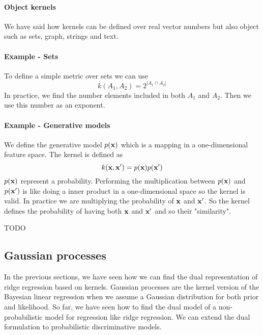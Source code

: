 \documentclass[main.tex]{subfiles}
\begin{document}
\paragraph{Object kernels}
We have said how kernels can be defined over real vector numbers but also object such as sets, graph, strings and text.
\paragraph{Example - Sets} To define a simple metric over sets we can use
\begin{equation}
    k(A_1,A_2) = 2^{|A_1 \cap  A_2|}
\end{equation}
In practice, we find the number elements included in both $A_1$ and $A_2$. Then we use this number as an exponent.
\paragraph{Example - Generative models} We define the generative model $p(\textbf{x})$ which is a mapping in a one-dimensional feature space. The kernel is defined as
\begin{equation}
    k(\textbf{x},\textbf{x}') = p(\textbf{x})p(\textbf{x}')
\end{equation}
$p(\textbf{x})$ represent a probability. Performing the multiplication between $p(\textbf{x})$ and $p(\textbf{x}')$ is like doing a inner product in a one-dimensional space so the kernel is valid. In practice we are multiplying the probability of $\textbf{x}$ and $\textbf{x}'$. So the kernel defines the probability of having both $\textbf{x}$ and $\textbf{x}'$ and so their "similarity".


{\huge{TODO}}

\subsection{Gaussian processes}
In the previous sections, we have seen how we can find the dual representation of ridge regression based on kernels. Gaussian processes are the kernel version of the Bayesian linear regression when we assume a Gaussian distribution for both prior and likelihood. So far, we have seen how to find the dual model of a non-probabilistic model for regression like ridge regression. We can extend the dual formulation to probabilistic discriminative models.
\end{document}
